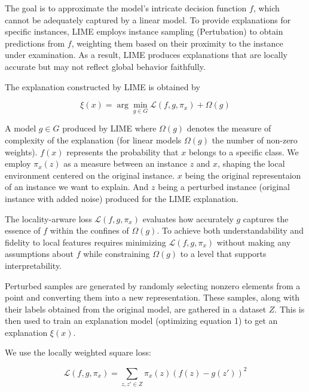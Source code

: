 \documentclass{article}
\begin{document}
The goal is to approximate the model's intricate decision function $f$, which cannot be adequately captured by a linear model. To provide explanations for specific instances, LIME employs instance sampling (Pertubation) to obtain predictions from $f$, weighting them based on their proximity to the instance under examination. As a result, LIME produces explanations that are locally accurate but may not reflect global behavior faithfully.

The explanation constructed by LIME is obtained by

\begin{equation}
\xi(x) = \arg \min_{g \in G}  \mathcal{L}(f, g, \pi_x) + \Omega(g)    
\end{equation}

A model $g \in G$ produced by LIME where $\Omega(g)$ denotes the measure of complexity of the explanation (for linear models $\Omega(g)$ the number of non-zero weights). 
$f(x)$ represents the probability that $x$ belongs to a specific class.
We employ $\pi_x(z)$ as a measure between an instance $z$ and $x$, shaping the local environment centered on the original instance. 
$x$ being the original representaion of an instance we want to explain. And $z$ being a perturbed instance (original instance with added noise) produced for the LIME explanation. 

The locality-arware loss $\mathcal{L}(f, g, \pi_x)$ evaluates how accurately $g$ captures the essence of $f$ within the confines of $\Omega(g)$. 
To achieve both understandability and fidelity to local features requires minimizing $\mathcal{L}(f, g, \pi_x)$ without making any assumptions about $f$ while constraining $\Omega(g)$ to a level that supports interpretability. 

Perturbed samples are generated by randomly selecting nonzero elements from a point and converting them into a new representation. These samples, along with their labels obtained from the original model, are gathered in a dataset $Z$. This is then used to train an explanation model (optimizing equation 1) to get an explanation $\xi(x)$. 

We use the locally weighted square loss:

\begin{equation}
\mathcal{L}(f, g, \pi_x) = \sum_{z, z' \in Z } \pi_x(z)(f(z)-g(z'))^2
\end{equation}
\end{document}

